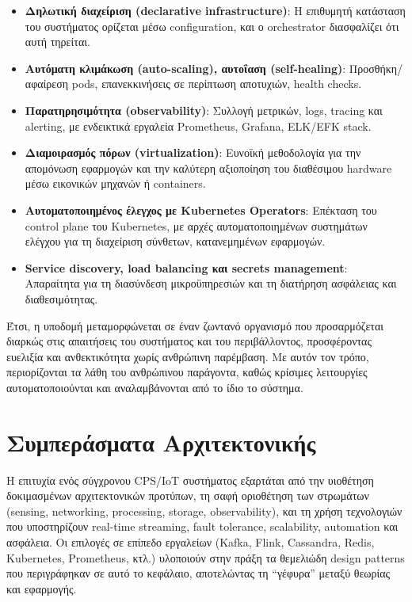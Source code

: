 \begin{itemize}
	\item \textbf{Δηλωτική διαχείριση (declarative infrastructure)}: Η επιθυμητή κατάσταση του συστήματος ορίζεται μέσω configuration, και ο orchestrator διασφαλίζει ότι αυτή τηρείται.
	\item \textbf{Αυτόματη κλιμάκωση (auto-scaling), αυτοΐαση (self-healing)}: Προσθήκη/αφαίρεση pods, επανεκκινήσεις σε περίπτωση αποτυχιών, health checks.
	\item \textbf{Παρατηρησιμότητα (observability)}: Συλλογή μετρικών, logs, tracing και alerting, με ενδεικτικά εργαλεία Prometheus, Grafana, ELK/EFK stack.
	\item \textbf{Διαμοιρασμός πόρων (virtualization)}: Ευνοϊκή μεθοδολογία για την απομόνωση εφαρμογών και την καλύτερη αξιοποίηση του διαθέσιμου hardware μέσω εικονικών μηχανών ή containers.
	\item \textbf{Αυτοματοποιημένος έλεγχος με Kubernetes Operators}: Επέκταση του control plane του Kubernetes, με αρχές αυτοματοποιημένων συστημάτων ελέγχου για τη διαχείριση σύνθετων, κατανεμημένων εφαρμογών.
	\item \textbf{Service discovery, load balancing και secrets management}: Απαραίτητα για τη διασύνδεση μικροϋπηρεσιών και τη διατήρηση ασφάλειας και διαθεσιμότητας.
\end{itemize}

Έτσι, η υποδομή μεταμορφώνεται σε έναν ζωντανό οργανισμό που προσαρμόζεται διαρκώς στις απαιτήσεις του συστήματος και του περιβάλλοντος, προσφέροντας ευελιξία και ανθεκτικότητα χωρίς ανθρώπινη παρέμβαση. Με αυτόν τον τρόπο, περιορίζονται τα λάθη του ανθρώπινου παράγοντα, καθώς κρίσιμες λειτουργίες αυτοματοποιούνται και αναλαμβάνονται από το ίδιο το σύστημα.

\section{Συμπεράσματα Αρχιτεκτονικής}

Η επιτυχία ενός σύγχρονου CPS/IoT συστήματος εξαρτάται από την υιοθέτηση δοκιμασμένων αρχιτεκτονικών προτύπων, τη σαφή οριοθέτηση των στρωμάτων (sensing, networking, processing, storage, observability), και τη χρήση τεχνολογιών που υποστηρίζουν real-time streaming, fault tolerance, scalability, automation και ασφάλεια. Οι επιλογές σε επίπεδο εργαλείων (Kafka, Flink, Cassandra, Redis, Kubernetes, Prometheus, κτλ.) υλοποιούν στην πράξη τα θεμελιώδη design patterns που περιγράφηκαν σε αυτό το κεφάλαιο, αποτελώντας τη “γέφυρα” μεταξύ θεωρίας και εφαρμογής.
